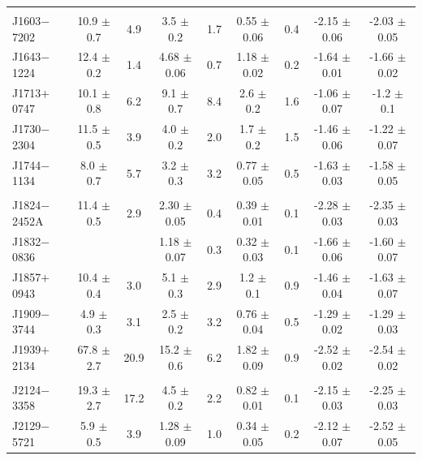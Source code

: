 \documentclass[useAMS,usenatbib]{mn2e}
\begin{document}
\begin{table}
\begin{tabular}{lcccccccc}
               &	                 &        &                   &       &                  &        &                   &                   \\   
 J1603$-$7202  &  10.9  $\pm$ 0.7  &  4.9   &  3.5   $\pm$ 0.2  &  1.7  &  0.55 $\pm$ 0.06 &  0.4   &  -2.15 $\pm$ 0.06 &  -2.03 $\pm$ 0.05 \\ 
 J1643$-$1224  &  12.4  $\pm$ 0.2  &  1.4   &  4.68  $\pm$ 0.06 &  0.7  &  1.18 $\pm$ 0.02 &  0.2   &  -1.64 $\pm$ 0.01 &  -1.66 $\pm$ 0.02 \\ 
 J1713$+$0747  &  10.1  $\pm$ 0.8  &  6.2   &  9.1   $\pm$ 0.7  &  8.4  &  2.6  $\pm$ 0.2  &  1.6   &  -1.06 $\pm$ 0.07 &  -1.2  $\pm$ 0.1 \\ 
 J1730$-$2304  &  11.5  $\pm$ 0.5  &  3.9   &  4.0   $\pm$ 0.2  &  2.0  &  1.7  $\pm$ 0.2  &  1.5   &  -1.46 $\pm$ 0.06 &  -1.22 $\pm$ 0.07 \\ 
 J1744$-$1134  &  8.0   $\pm$ 0.7  &  5.7   &  3.2   $\pm$ 0.3  &  3.2  &  0.77 $\pm$ 0.05 &  0.5   &  -1.63 $\pm$ 0.03 &  -1.58 $\pm$ 0.05 \\ 
               &	                 &        &                   &       &                  &        &                   &                   \\  
 J1824$-$2452A &  11.4  $\pm$ 0.5  &  2.9   &  2.30  $\pm$ 0.05 &  0.4  &  0.39 $\pm$ 0.01 &  0.1   &  -2.28 $\pm$ 0.03 &  -2.35 $\pm$ 0.03 \\ 
 J1832$-$0836  &	                 &        &  1.18  $\pm$ 0.07 &  0.3  &  0.32 $\pm$ 0.03 &  0.1   &  -1.66 $\pm$ 0.06 &  -1.60 $\pm$ 0.07 \\ 
 J1857$+$0943  &  10.4  $\pm$ 0.4  &  3.0   &  5.1   $\pm$ 0.3  &  2.9  &  1.2  $\pm$ 0.1  &  0.9   &  -1.46 $\pm$ 0.04 &  -1.63 $\pm$ 0.07 \\ 
 J1909$-$3744  &  4.9   $\pm$ 0.3  &  3.1   &  2.5   $\pm$ 0.2  &  3.2  &  0.76 $\pm$ 0.04 &  0.5   &  -1.29 $\pm$ 0.02 &  -1.29 $\pm$ 0.03 \\ 
 J1939$+$2134  &  67.8  $\pm$ 2.7  &  20.9  &  15.2  $\pm$ 0.6  &  6.2  &  1.82 $\pm$ 0.09 &  0.9   &  -2.52 $\pm$ 0.02 &  -2.54 $\pm$ 0.02 \\ 
               &	                 &        &                   &       &                  &        &                   &                   \\   
 J2124$-$3358  &  19.3  $\pm$ 2.7  &  17.2  &  4.5   $\pm$ 0.2  &  2.2  &  0.82 $\pm$ 0.01 &  0.1   &  -2.15 $\pm$ 0.03 &  -2.25 $\pm$ 0.03 \\ 
 J2129$-$5721  &  5.9   $\pm$ 0.5  &  3.9   &  1.28  $\pm$ 0.09 &  1.0  &  0.34 $\pm$ 0.05 &  0.2   &  -2.12 $\pm$ 0.07 &  -2.52 $\pm$ 0.05 \\ 

\end{tabular}
\end{table}
\end{document}
